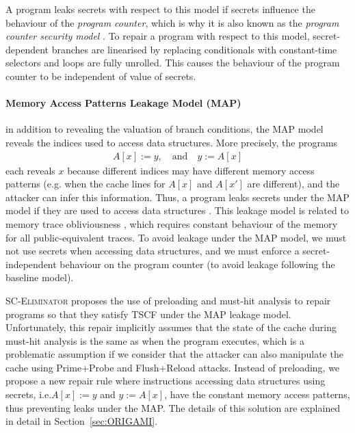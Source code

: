 A program leaks secrets with respect to this model if secrets influence the behaviour of the \emph{program counter}, which is why it is also known as the \emph{program counter security model} \cite{Molnar}. To repair a program with respect to this model, secret-dependent branches are linearised by replacing conditionals with constant-time selectors and loops are fully unrolled. This causes the behaviour of the program counter to be independent of value of secrets.

\paragraph*{Memory Access Patterns Leakage Model (MAP)}
in addition to revealing the valuation of branch conditions, the MAP model reveals the indices used to access data structures. More precisely, the programs
\begin{align*}
    A[x]:=y,\quad \text{and} \quad y:=A[x]
\end{align*}
each reveals $x$ because different indices may have different memory access patterns (e.g. when the cache lines for $A[x]$ and $A[x']$ are different), and the attacker can infer this information. Thus, a program leaks secrets under the MAP model if they are used to access data structures \cite{usenix_ctp_verification}. This leakage model is related to {memory trace obliviousness} \cite{MemoryTraceOblivious}, which requires constant behaviour of the memory for all public-equivalent traces. To avoid leakage under the MAP model, we must not use secrets when accessing data structures, and we must enforce a secret-independent behaviour on the program counter (to avoid leakage following the baseline model).

\textsc{SC-Eliminator} proposes the use of preloading and must-hit analysis to repair programs so that they satisfy TSCF under the MAP leakage model. 
Unfortunately, this repair implicitly assumes that the state of the cache during must-hit analysis is the same as when the program executes, which is a problematic assumption if we consider that the attacker can also manipulate the cache using Prime+Probe and Flush+Reload attacks. 
Instead of preloading, we propose a new repair rule where instructions accessing data structures using secrets, i.e.$A[x]:=y$ and $y:=A[x]$, have the constant memory access patterns, thus preventing leaks under the MAP. The details of this solution are explained in detail in Section~\ref{sec:ORIGAMI}.
 
